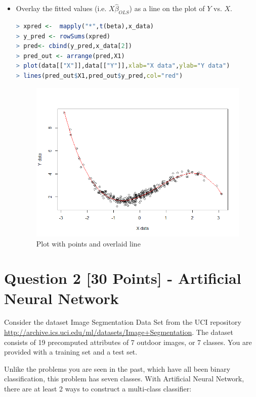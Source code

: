 \documentclass[fontsize=10pt,DIV=14]{scrartcl}
\begin{document}
\begin{enumerate}
\begin{itemize}
		\item
		Overlay the fitted values (i.e. $X\hat{\beta}_{OLS}$) as a line on the plot of $Y$ vs. $X$.
		\begin{lstlisting}[language=R,frame=single]
> xpred <-  mapply("*",t(beta),x_data)
> y_pred <- rowSums(xpred)
> pred<- cbind(y_pred,x_data[2])
> pred_out <- arrange(pred,X1)
> plot(data[["X"]],data[["Y"]],xlab="X data",ylab="Y data")
> lines(pred_out$X1,pred_out$y_pred,col="red")
		\end{lstlisting}
		\begin{figure}[H]
				\begin{center}
					\includegraphics[width=\textwidth]{resources/q1_2_img2.png}
					\caption{Plot with points and overlaid line}
				\end{center}
			\end{figure}
		\end{itemize}
	\end{enumerate}

	\section{Question 2 [30 Points] - Artiﬁcial Neural Network}

	Consider the dataset Image Segmentation Data Set from the UCI repository \url{http://archive.ics.uci.edu/ml/datasets/Image+Segmentation}. The dataset consists of 19 precomputed attributes of 7 outdoor images, or 7 classes. You are provided with a training set and a test set. 

	Unlike the problems you are seen in the past, which have all been binary classiﬁcation, this problem has seven classes. With Artiﬁcial Neural Network, there are at least 2 ways to construct a multi-class classiﬁer:
\end{document}
